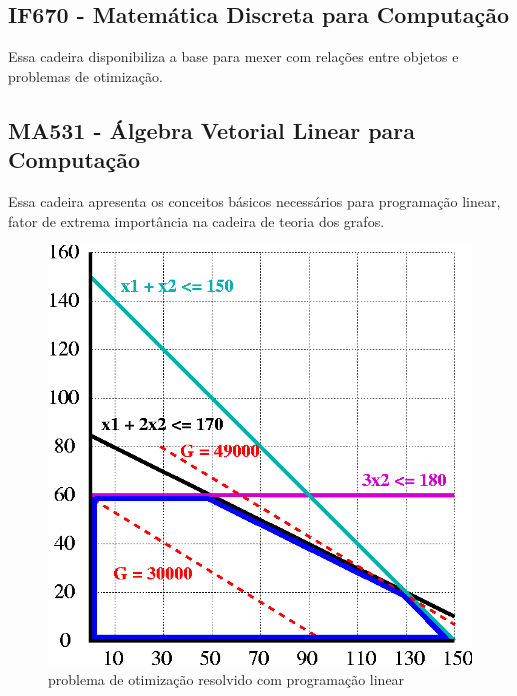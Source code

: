 \documentclass[10pt]{article}
\begin{document}
\subsection{IF670 - Matemática Discreta para Computação}
Essa cadeira disponibiliza a base para mexer com relações entre objetos e problemas de otimização.
\subsection{MA531 - Álgebra Vetorial Linear para Computação}
Essa cadeira apresenta os conceitos básicos necessários para programação linear, fator de extrema importância na cadeira de teoria dos grafos.
\begin{figure}[h!]
\centering
\includegraphics[scale=0.22]{Linear_programming_polytope.png}
\caption{problema de otimização resolvido com programação linear \cite{wiki:xxh}}
\label{fig:programacao linear}
\end{figure}


\end{document}
